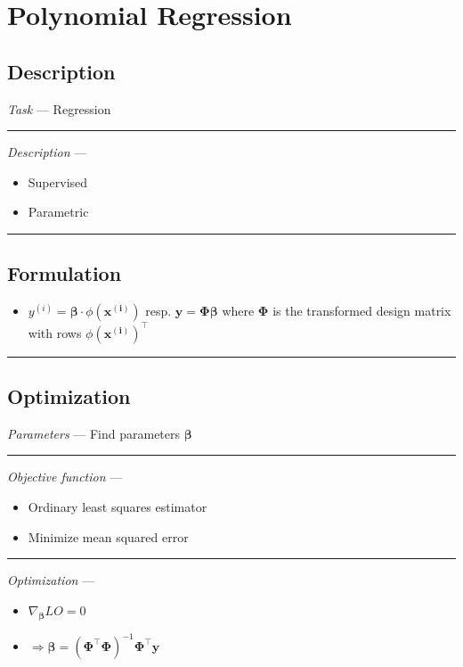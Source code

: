 \section{Polynomial Regression}
\subsection*{Description}
\emph{Task} --- Regression

{\color{lightgray}\hrule height 0.001mm}

\emph{Description} --- 
\begin{itemize}
    \item Supervised 
    \item Parametric
\end{itemize}

{\color{black}\hrule height 0.001mm}

\subsection*{Formulation}

\begin{itemize}
    \item $y^{(i)} = \boldsymbol{\beta} \cdot \phi(\boldsymbol{x^{(i)}})$ resp. $\boldsymbol{y} = \boldsymbol{\Phi}\boldsymbol{\beta}$ where $\boldsymbol{\Phi}$  is the transformed design matrix with rows $\phi(\boldsymbol{x^{(i)}})^\intercal$
\end{itemize}

{\color{black}\hrule height 0.001mm}

\subsection*{Optimization}
\emph{Parameters} --- Find parameters $\boldsymbol{\beta}$

{\color{lightgray}\hrule height 0.001mm}

\emph{Objective function} --- 
\begin{itemize}
    \item Ordinary least squares estimator
    \item Minimize mean squared error 
\end{itemize}

{\color{lightgray}\hrule height 0.001mm}

\emph{Optimization} ---
\begin{itemize}
    \item $\nabla_{\boldsymbol{\beta}} LO = 0$
    \item $\Rightarrow \boldsymbol{\beta} = (\boldsymbol{\Phi}^\intercal \boldsymbol{\Phi})^{-1}  \boldsymbol{\Phi}^\intercal \boldsymbol{y}$
\end{itemize}

